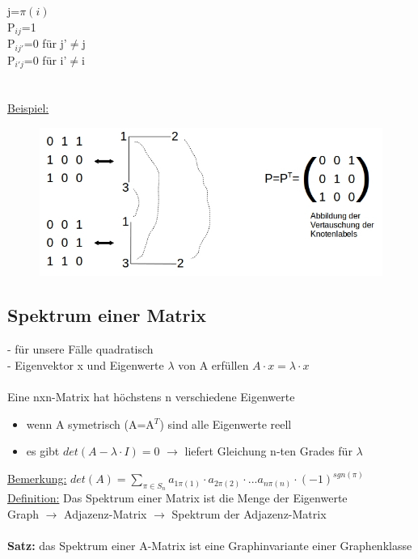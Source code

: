 j=$\pi(i)$\\
P$_{ij}$=1\\
P$_{ij'}$=0 für j'$\neq$j\\
P$_{i'j}$=0 für i'$\neq$i\\
\\\\
\underline{Beispiel:}
\begin{figure}[htp]
\centering
\includegraphics[width=1\textwidth]{lectures/161021/pix/pic13.jpg}
\end{figure}

\newpage
\subsection{Spektrum einer Matrix}
- für unsere Fälle quadratisch\\
- Eigenvektor x und Eigenwerte $\lambda$ von A erfüllen $A \cdot x = \lambda \cdot x$
\\\\
Eine nxn-Matrix hat höchstens n verschiedene Eigenwerte
\begin{itemize}
	\item wenn A symetrisch (A=A$^T$) sind alle Eigenwerte reell
	\item es gibt $det(A-\lambda \cdot I)=0$ $\rightarrow$ liefert Gleichung n-ten Grades für $\lambda$
\end{itemize}

\underline{Bemerkung:} $det(A) = \displaystyle \sum_{\pi \in S_n} a_{1 \pi (1)} \cdot a_{2 \pi (2)} \cdot ... a_{n \pi (n)} \cdot (-1)^{sgn(\pi)}$\\
\underline{Definition:} Das Spektrum einer Matrix ist die Menge der Eigenwerte\\
Graph $\rightarrow$ Adjazenz-Matrix $\rightarrow$ Spektrum der Adjazenz-Matrix
\\\\
\textbf{Satz:} das Spektrum einer A-Matrix ist eine Graphinvariante einer Graphenklasse